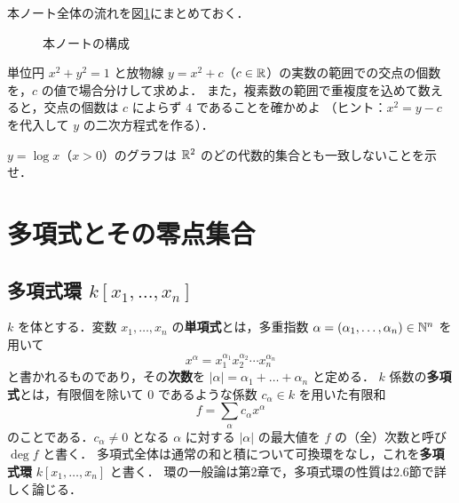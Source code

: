 本ノート全体の流れを図\ref{fig:ch01-roadmap}にまとめておく．

\begin{figure}[H]
\centering
{}
\caption{本ノートの構成}\label{fig:ch01-roadmap}
\end{figure}

単位円 $x^2+y^2=1$ と放物線 $y=x^2+c$（$c\in\mathbb{R}$）の実数の範囲での交点の個数を，$c$ の値で場合分けして求めよ．
また，複素数の範囲で重複度を込めて数えると，交点の個数は $c$ によらず $4$ であることを確かめよ
（ヒント：$x^2=y-c$ を代入して $y$ の二次方程式を作る）．

$y=\log x$（$x>0$）のグラフは $\mathbb{R}^2$ のどの代数的集合とも一致しないことを示せ．

\section{多項式とその零点集合}

\subsection{多項式環 $k[x_1,\dots,x_n]$}

$k$ を体とする．変数 $x_1,\dots,x_n$ の\textbf{単項式}とは，多重指数 $\alpha=(\alpha_1,\dots,\alpha_n)\in\mathbb{N}^n$ を用いて
\[
  x^\alpha=x_1^{\alpha_1}x_2^{\alpha_2}\cdots x_n^{\alpha_n}
\]
と書かれるものであり，その\textbf{次数}を $|\alpha|=\alpha_1+\dots+\alpha_n$ と定める．
$k$ 係数の\textbf{多項式}とは，有限個を除いて $0$ であるような係数 $c_\alpha\in k$ を用いた有限和
\[
  f=\sum_{\alpha}c_\alpha x^\alpha
\]
のことである．$c_\alpha\ne0$ となる $\alpha$ に対する $|\alpha|$ の最大値を $f$ の（全）次数と呼び $\deg f$ と書く．
多項式全体は通常の和と積について可換環をなし，これを\textbf{多項式環} $k[x_1,\dots,x_n]$ と書く．
環の一般論は第2章で，多項式環の性質は2.6節で詳しく論じる．

